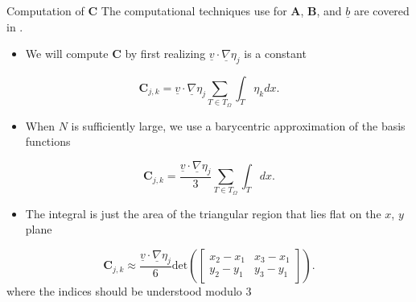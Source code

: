 \documentclass[10pt]{beamer}
\begin{document}
\begin{frame} {Computation of $\mathbf{C}$}
The computational techniques use for $\mathbf{A}$, $\mathbf{B}$, and $\underline{b}$ are covered in \cite{50LinesofMATLAB}.
\begin{itemize}
\item We will compute $\mathbf{C}$ by first realizing $\underline{v} \cdot \underline{\nabla}\eta_{j}$ is a constant
\end{itemize}
\begin{equation}
\mathbf{C}_{j,k} = \underline{v}\cdot \underline{\nabla}\eta_{j}\sum_{T \in T_{\Omega}}\int_{T}\eta_{k} dx.
\end{equation}

\begin{itemize}
\item When $N$ is sufficiently large, we use a barycentric approximation of the basis functions
\end{itemize}

\begin{equation}
\mathbf{C}_{j,k} = \frac{\underline{v}\cdot \underline{\nabla}\eta_{j}}{3}\sum_{T \in T_{\Omega}}\int_{T} dx.
\end{equation}

\begin{itemize}
\item The integral is just the area of the triangular region that lies flat on the $x$, $y$ plane
\end{itemize}

\begin{equation}
 \mathbf{C}_{j,k}\approx \frac{\underline{v}\cdot \underline{\nabla}\eta_{j}}{6}\text{det}\left(\begin{bmatrix}x_{2}-x_{1} & x_{3}-x_{1} \\ y_{2}-y_{1} & y_{3}-y_{1} \end{bmatrix}\right).
\end{equation}
where the indices should be understood modulo 3


\end{frame}
\end{document}
